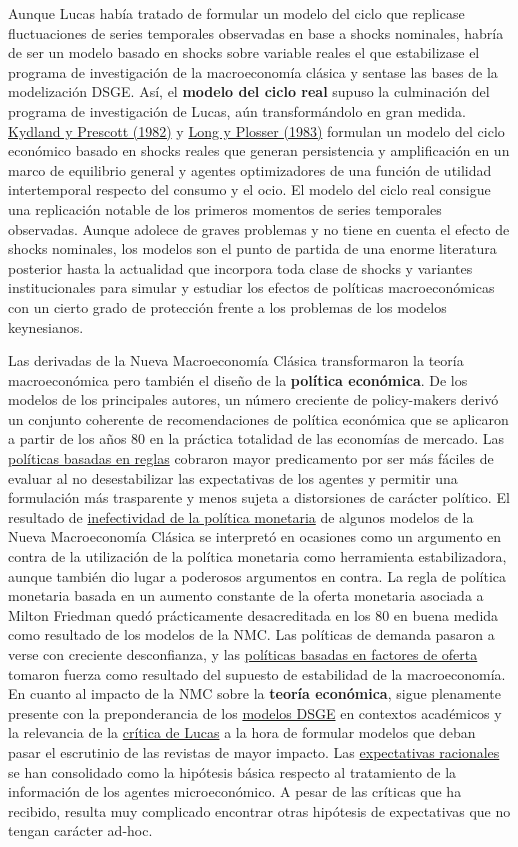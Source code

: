 \documentclass{nuevotema}
\begin{document}
Aunque Lucas había tratado de formular un modelo del ciclo que replicase fluctuaciones de series temporales observadas en base a shocks nominales, habría de ser un modelo basado en shocks sobre variable reales el que estabilizase el programa de investigación de la macroeconomía clásica y sentase las bases de la modelización DSGE. Así, el \textbf{modelo del ciclo real} supuso la culminación del programa de investigación de Lucas, aún transformándolo en gran medida. \underline{Kydland y Prescott (1982)} y \underline{Long y Plosser (1983)} formulan un modelo del ciclo económico basado en shocks reales que generan persistencia y amplificación en un marco de equilibrio general y agentes optimizadores de una función de utilidad intertemporal respecto del consumo y el ocio. El modelo del ciclo real consigue una replicación notable de los primeros momentos de series temporales observadas. Aunque adolece de graves problemas y no tiene en cuenta el efecto de shocks nominales, los modelos son el punto de partida de una enorme literatura posterior hasta la actualidad que incorpora toda clase de shocks y variantes institucionales para simular y estudiar los efectos de políticas macroeconómicas con un cierto grado de protección frente a los problemas de los modelos keynesianos. 

Las  derivadas de la Nueva Macroeconomía Clásica transformaron la teoría macroeconómica pero también el diseño de la \textbf{política económica}. De los modelos de los principales autores, un número creciente de policy-makers derivó un conjunto coherente de recomendaciones de política económica que se aplicaron a partir de los años 80 en la práctica totalidad de las economías de mercado. Las \underline{políticas basadas en reglas} cobraron mayor predicamento por ser más fáciles de evaluar al no desestabilizar las expectativas de los agentes y permitir una formulación más trasparente y menos sujeta a distorsiones de carácter político. El resultado de \underline{inefectividad de la política monetaria} de algunos modelos de la Nueva Macroeconomía Clásica se interpretó en ocasiones como un argumento en contra de la utilización de la política monetaria como herramienta estabilizadora, aunque también dio lugar a poderosos argumentos en contra. La regla de política monetaria basada en un aumento constante de la oferta monetaria asociada a Milton Friedman quedó prácticamente desacreditada en los 80 en buena medida como resultado de los modelos de la NMC. Las políticas de demanda pasaron a verse con creciente desconfianza, y las \underline{políticas basadas en factores de oferta} tomaron fuerza como resultado del supuesto de estabilidad de la macroeconomía. En cuanto al impacto de la NMC sobre la \textbf{teoría económica}, sigue plenamente presente con la preponderancia de los \underline{modelos DSGE} en contextos académicos y la relevancia de la \underline{crítica de Lucas} a la hora de formular modelos que deban pasar el escrutinio de las revistas de mayor impacto. Las \underline{expectativas racionales} se han consolidado como la hipótesis básica respecto al tratamiento de la información de los agentes microeconómico. A pesar de las críticas que ha recibido, resulta muy complicado encontrar otras hipótesis de expectativas que no tengan carácter ad-hoc.
\end{document}
